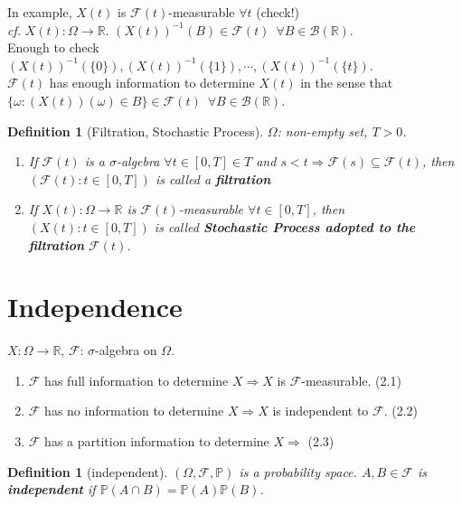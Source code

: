 \documentclass[12pt]{report}
\renewcommand{\1}{\mathbb{1}}
\renewcommand{\subset}{\subseteq}
\theoremstyle{break}
\theoremstyle{newdef}
\newtheorem{defn}[thm]{Definition} %
\theoremstyle{remark}
\begin{document}
In example, $X(t)$ is $\mathcal{F}(t)$-measurable $\forall t$ (check!)\\
\textit{cf.} $X(t) : \Omega \rightarrow \mathbb{R}$.
$(X(t))^{-1}(B) \in \mathcal{F}(t) \enspace \forall B \in \mathcal{B}(\mathbb{R})$.\\
Enough to check $(X(t))^{-1}(\{0\}), (X(t))^{-1}(\{1\}), \cdots, (X(t))^{-1}(\{t\})$.\\
$\mathcal{F}(t)$ has enough information to determine $X(t)$ in the sense that
$\{\omega: (X(t))(\omega) \in B\} \in \mathcal{F}(t) \enspace \forall B \in \mathcal{B}(\mathbb{R})$.

\begin{defn}[Filtration, Stochastic Process]
$\Omega$: non-empty set, $T > 0$.
\begin{enumerate}
\item If $\mathcal{F}(t)$ is a $\sigma$-algebra $\forall t \in [0,T] \in T$ and $s < t \Rightarrow \mathcal{F}(s) \subset \mathcal{F}(t)$,
then $(\mathcal{F}(t) : t \in [0,T])$ is called a \textbf{filtration}
\item If $X(t) : \Omega \rightarrow \mathbb{R}$ is $\mathcal{F}(t)$-measurable $\forall t \in [0,T]$,
then $(X(t) : t \in [0,T])$ is called \textbf{Stochastic Process adopted to the filtration} $\mathcal{F}(t)$.
\end{enumerate}
\end{defn}


\section{Independence}

$X : \Omega \rightarrow \mathbb{R}$, $\mathcal{F}$: $\sigma$-algebra on $\Omega$.
\begin{enumerate}
\item $\mathcal{F}$ has full information to determine $X \Rightarrow X$ is $\mathcal{F}$-measurable. (2.1)
\item $\mathcal{F}$ has no information to determine $X \Rightarrow X$ is independent to $\mathcal{F}$. (2.2)
\item $\mathcal{F}$ has a partition information to determine $X \Rightarrow$ (2.3)
\end{enumerate}




\begin{defn}[independent]
$(\Omega, \mathcal{F}, \mathbb{P})$ is a probability space.
$A, B \in \mathcal{F}$ is \textbf{independent} if $\mathbb{P}(A \cap B) = \mathbb{P}(A) \mathbb{P}(B)$.
\end{defn}
\end{document}

